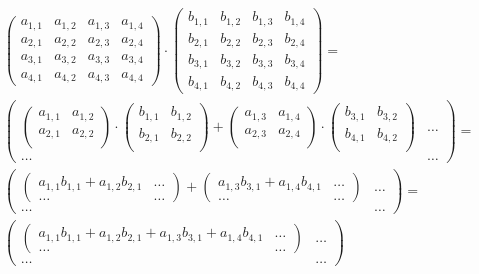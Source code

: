 \documentclass[thesis=B,czech]{FITthesis}[2012/06/26]
\begin{document}
\begin{align}
\begin{pmatrix}
a_{1,1} & a_{1,2} & a_{1,3} & a_{1,4} \\
a_{2,1} & a_{2,2} & a_{2,3} & a_{2,4} \\
a_{3,1} & a_{3,2} & a_{3,3} & a_{3,4} \\
a_{4,1} & a_{4,2} & a_{4,3} & a_{4,4}
\end{pmatrix} \cdot \begin{pmatrix}
b_{1,1} & b_{1,2} & b_{1,3} & b_{1,4} \\
b_{2,1} & b_{2,2} & b_{2,3} & b_{2,4} \\
b_{3,1} & b_{3,2} & b_{3,3} & b_{3,4} \\
b_{4,1} & b_{4,2} & b_{4,3} & b_{4,4}
\end{pmatrix} = \\
\begin{pmatrix}
\begin{pmatrix}
 a_{1,1} & a_{1,2} \\
 a_{2,1} & a_{2,2} \\
\end{pmatrix} \cdot
\begin{pmatrix}
 b_{1,1} & b_{1,2} \\
 b_{2,1} & b_{2,2} \\
\end{pmatrix} + 
\begin{pmatrix}
 a_{1,3} & a_{1,4} \\
 a_{2,3} & a_{2,4} \\
\end{pmatrix} \cdot 
\begin{pmatrix}
 b_{3,1} & b_{3,2} \\
 b_{4,1} & b_{4,2} \\
\end{pmatrix} &
\hdots \\
\hdots & \hdots
\end{pmatrix} = \\
\begin{pmatrix}
\begin{pmatrix}
 a_{1,1} b_{1,1}+a_{1,2} b_{2,1} & \hdots \\
 \hdots & \hdots
\end{pmatrix} + 
\begin{pmatrix}
 a_{1,3} b_{3,1}+a_{1,4} b_{4,1} & \hdots \\
 \hdots & \hdots
\end{pmatrix} &
\hdots \\
\hdots & \hdots
\end{pmatrix} = \\
\begin{pmatrix}
\begin{pmatrix}
 a_{1,1} b_{1,1}+a_{1,2} b_{2,1}+a_{1,3} b_{3,1}+a_{1,4} b_{4,1} & \hdots \\
\hdots & \hdots
\end{pmatrix} &
\hdots \\\hdots & \hdots
\end{pmatrix}
\end{align}
\end{document}
